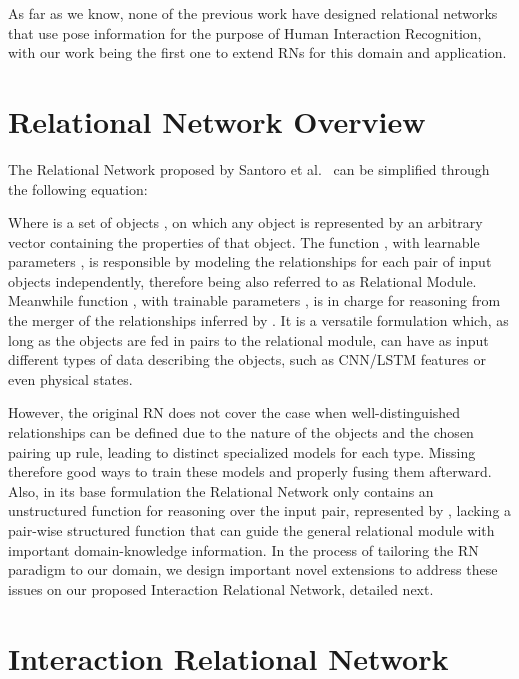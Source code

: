 \documentclass[journal,twoside]{IEEEtran}
\begin{document}
As far as we know, none of the previous work have designed relational networks that use pose information for the purpose of Human Interaction Recognition, with our work being the first one to extend RNs for this domain and application.




 \section{Relational Network Overview} \label{sec:related_concepts}


The Relational Network proposed by Santoro et al.~\cite{Santoro2017} can be simplified through the following equation:



Where  is a set of objects , 
on which any  object is represented by an arbitrary  vector containing the properties of that object. The function , with learnable parameters , is responsible by modeling the relationships for each pair of input objects independently, therefore being also referred to as Relational Module.
Meanwhile function , with trainable parameters , is in charge for reasoning from the merger of the relationships inferred by .
It is a versatile formulation which, as long as the objects are fed in pairs to the relational module, can have as input different types of data describing the objects, such as CNN/LSTM features or even physical states.


However, the original RN does not cover the case when well-distinguished relationships can be defined due to the nature of the objects and the chosen pairing up rule, leading to distinct specialized models for each type. Missing therefore good ways to train these models and properly fusing them afterward. 
Also, in its base formulation the Relational Network only contains an unstructured function for reasoning over the input pair, represented by , lacking a pair-wise structured function that can guide the general relational module with important domain-knowledge information.
In the process of tailoring the RN paradigm to our domain, we design important novel extensions to address these issues on our proposed Interaction Relational Network, detailed next.


 \section{Interaction Relational Network}
\label{sec:prop_method}
\end{document}
